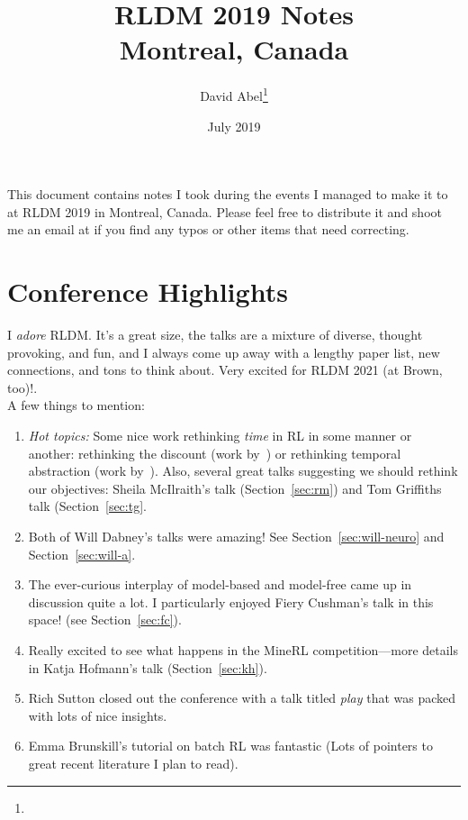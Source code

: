 \documentclass[11pt]{article}
\title{RLDM 2019 Notes \\ \Large{Montreal, Canada}}
\author{David Abel\footnote{\durl{http://david-abel.github.io}} \\ \durl{david_abel@brown.edu}}
\date{July 2019}
\begin{document}
\maketitle
\tableofcontents
\newpage


This document contains notes I took during the events I managed to make it to at RLDM 2019 in Montreal, Canada. Please feel free to distribute it and shoot me an email at  if you find any typos or other items that need correcting. 


\section{Conference Highlights}

I {\it adore} RLDM. It's a great size, the talks are a mixture of diverse, thought provoking, and fun, and I always come up away with a lengthy paper list, new connections, and tons to think about. Very excited for RLDM 2021 (at Brown, too)!. \\

A few things to mention:
\begin{enumerate}
    \item {\it Hot topics:} Some nice work rethinking {\it time} in RL in some manner or another: rethinking the discount (work by~\citet{fedus2019hyperbolic}) or rethinking temporal abstraction (work by~\citet{harutyunyan2019termination}). Also, several great talks suggesting we should rethink our objectives: Sheila McIlraith's talk (Section~\ref{sec:rm}) and Tom Griffiths talk (Section~\ref{sec:tg}.
    
    \item Both of Will Dabney's talks were amazing! See Section~\ref{sec:will-neuro} and Section~\ref{sec:will-a}.
    
    \item The ever-curious interplay of model-based and model-free came up in discussion quite a lot. I particularly enjoyed Fiery Cushman's talk in this space! (see Section~\ref{sec:fc}).
    
    \item Really excited to see what happens in the MineRL competition---more details in Katja Hofmann's talk (Section~\ref{sec:kh}).
    
    \item Rich Sutton closed out the conference with a talk titled {\it play} that was packed with lots of nice insights.
    
    \item Emma Brunskill's tutorial on batch RL was fantastic (Lots of pointers to great recent literature I plan to read).
\end{enumerate}
\end{document}
